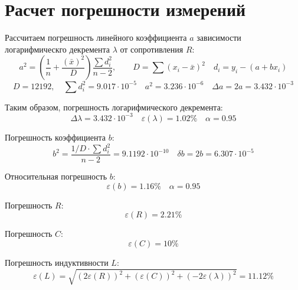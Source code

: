 \section{Расчет погрешности измерений}
Рассчитаем погрешность линейного коэффициента \(a\) зависимости
логарифмическго декремента \(\lambda\) от сопротивления \(R\):
\[
  a^2 = \left( \frac{1}{n} + \frac{(\bar x)^2}{D} \right) \frac{\sum d_i^2}{n-2},
  \qquad 
  D = \sum (x_i - \bar x)^2
  \quad
  d_i = y_i - (a + b x_i)
\]
\[
D = 12 192,
\quad
\sum d_i^2 = 9.017 \cdot 10^{-5}
\quad
a^2 = 3.236 \cdot 10^{-6}
\quad
\Delta a = 2 a = 3.432 \cdot 10^{-3}
\]

Таким образом, погрешность логарифмического декремента:
\[
  \Delta \lambda = 3.432 \cdot 10^{-3}
  \quad
  \varepsilon (\lambda) = 1.02 \%
  \quad
  \alpha = 0.95
\]

Погрешность коэффициента \(b\):
\[
  b^2 = \frac{1/D \cdot \sum d_i^2}{n-2} = 9.1192 \cdot 10^{-10}
  \quad
  \delta b = 2 b = 6.307 \cdot 10^{-5}
\]

Относительная погрешность \(b\):
\[
  \varepsilon(b) = 1.16 \%
  \quad
  \alpha = 0.95
\]

Погрешность \(R\):
\[
  \varepsilon(R) = 2.21 \%
\]

Погрешность \(C\):
\[
  \varepsilon(C) = 10 \%
\]

Погрешность индуктивности \(L\):
\[
  \varepsilon(L) =
  \sqrt{ (2 \varepsilon(R))^2 + (\varepsilon(C))^2 + (-2 \varepsilon(\lambda))^2  } =
  11.12 \%
\]

  
